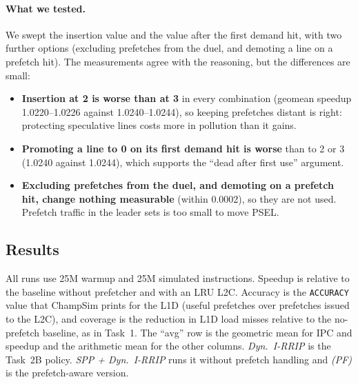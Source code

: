 \documentclass[11pt,a4paper]{article}
\begin{document}
\paragraph{What we tested.} We swept the insertion value and the value after the first demand hit, with two further options
(excluding prefetches from the duel, and demoting a line on a prefetch hit). The measurements agree with the reasoning, but the
differences are small:
\begin{itemize}
    \item \textbf{Insertion at 2 is worse than at 3} in every combination (geomean speedup 1.0220--1.0226 against 1.0240--1.0244), so
          keeping prefetches distant is right: protecting speculative lines costs more in pollution than it gains.
    \item \textbf{Promoting a line to 0 on its first demand hit is worse} than to 2 or 3 (1.0240 against 1.0244), which supports the
          ``dead after first use'' argument.
    \item \textbf{Excluding prefetches from the duel, and demoting on a prefetch hit, change nothing measurable} (within 0.0002),
          so they are not used. Prefetch traffic in the leader sets is too small to move PSEL.
\end{itemize}

\subsection{Results}

All runs use 25M warmup and 25M simulated instructions. Speedup is relative to the baseline without prefetcher and with an LRU L2C.
Accuracy is the \texttt{ACCURACY} value that ChampSim prints for the L1D (useful prefetches over prefetches issued to the L2C),
and coverage is the reduction in L1D load misses relative to the no-prefetch baseline, as in Task~1. The ``avg'' row is the
geometric mean for IPC and speedup and the arithmetic mean for the other columns. \emph{Dyn.\ I-RRIP} is the Task~2B policy.
\emph{SPP + Dyn.\ I-RRIP} runs it without prefetch handling and \emph{(PF)} is the prefetch-aware version.
\end{document}
